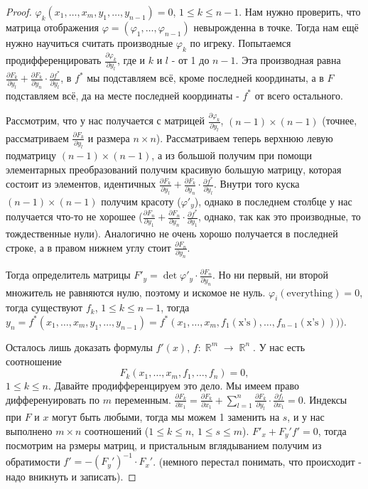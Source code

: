 \documentclass[a4paper,100pt]{article}
\theoremstyle{indented}
\theoremstyle{definition}
\theoremstyle{remark}
\DeclareMathOperator{\RR}{\mathbb{R}}
\begin{document}
\begin{proof}
    $\varphi_k(x_1, \ldots, x_m, y_1, \ldots, y_{n-1})=0$, $1\leq k\leq n-1$. Нам нужно проверить, что матрица отображения $\varphi=(\varphi_1, \ldots, \varphi_{n-1})$ невырожденна в точке. Тогда нам ещё нужно научиться считать производные $\varphi_k$ по игреку. Попытаемся продифференцировать $\frac{\partial \varphi_k}{\partial y_l}$, где и $k$ и $l$ - от 1 до $n-1$. Эта производная равна $\frac{\partial F_k}{\partial y_l}+\frac{\partial F_k}{\partial y_n}\cdot \frac{\partial f^*}{\partial y_l}$, в $f^*$ мы подставляем всё, кроме последней координаты, а в $F$ подставляем всё, да на месте последней координаты - $f^*$ от всего остального. \ 

    Рассмотрим, что у нас получается с матрицей $\frac{\partial \varphi_k}{\partial y_l}$, $(n-1)\times (n-1)$ (точнее, рассматриваем $\frac{\partial F_k}{\partial y_l}$ и размера $n\times n$). Рассматриваем теперь верхнюю левую подматрицу $(n-1)\times(n-1)$, а из большой получим при помощи элементарных преобразований получим красивую большую матрицу, которая состоит из элементов, идентичных $\frac{\partial F_k}{\partial y_l}+\frac{\partial F_k}{\partial y_n}\cdot \frac{\partial f^*}{\partial y_l}$. Внутри того куска $(n-1)\times (n-1)$ получим красоту ($\varphi'_y$), однако в последнем столбце у нас получается что-то не хорошее ($\frac{\partial F_n}{\partial y_1}+\frac{\partial F_n}{\partial y_n}\cdot \frac{\partial f^*}{\partial y_1}$, однако, так как это производные, то тождественные нули). Аналогично не очень хорошо получается в последней строке, а в правом нижнем углу стоит $\frac{\partial F_n}{\partial y_n}$. \ 

    Тогда определитель матрицы $F'_y=\det \varphi'_y \cdot \frac{\partial F_n}{\partial y_n}$. Но ни первый, ни второй множитель не равняются нулю, поэтому и искомое не нуль.  $\varphi_i(\text{everything})=0$, тогда существуют $f_k$, $1\leq k\leq n-1$, тогда $y_n=f^*(x_1, \ldots, x_m, y_1, \ldots, y_{n-1})=f^*(x_1, \ldots, x_m, f_1(\text{x's}), \ldots, f_{n-1}(\text{x's}))))$. \ 

    Осталось лишь доказать формулы $f'(x)$, $f:\RR^m \rightarrow \RR^n$. У нас есть соотношение 
    \[
        F_k(x_1, \ldots, x_m, f_1, \ldots, f_n)=0, 
    \] 
    $1\leq k\leq n$. Давайте продифференцируем это дело. Мы имеем право дифференуировать по $m$ переменным. $\frac{\partial F_k}{\partial x_1}= \frac{\partial F_k}{\partial x_1} + \sum_{l=1}^n\frac{\partial F_k}{\partial y_l}\cdot \frac{\partial f_l}{\partial x_1}=0$. Индексы при $F$ и $x$ могут быть любыми, тогда мы можем 1 заменить на $s$, и у нас выполнено $m\times n$ соотношений ($1\leq k \leq n$, $1\leq s\leq m$). $F'_x+F_y'f'=0$, тогда посмотрим на рзмеры матриц, и пристальным вглядыванием получим из обратимости $f'=-(F_y')^{-1}\cdot F_x'$. (немного перестал понимать, что происходит - надо вникнуть и записать).
\end{proof}
\end{document}
